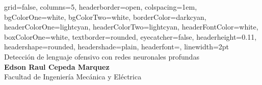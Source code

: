 \documentclass[a0paper,portrait]{baposter}
\begin{document}

\begin{poster}
{
grid=false,
columns=5,
headerborder=open, %
colspacing=1em, %
bgColorOne=white, %
bgColorTwo=white, %
borderColor=darkcyan, %
headerColorOne=lightcyan, %
headerColorTwo=lightcyan, %
headerFontColor=white, %
boxColorOne=white, %
textborder=rounded, %
eyecatcher=false, %
headerheight=0.11\textheight, %
headershape=rounded, %
headershade=plain,
headerfont=\Large\textsf, %
linewidth=2pt %
}
{}
%
%
{
\textsf{Detección de lenguaje ofensivo con redes neuronales profundas} %
} %
{
\sf\vspace{0.3em}\\
\textbf{Edson Raul Cepeda Marquez}
\vspace{0.1em}\\
\small{Facultad de Ingeniería Mecánica y Eléctrica
\vspace{0.2em}\\
}}
\end{poster}
\end{document}
